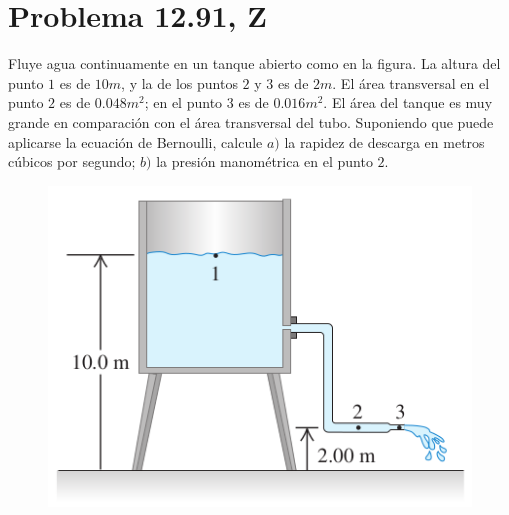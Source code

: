 \section*{Problema 12.91, Z}


Fluye agua continuamente en un tanque abierto como en la figura. La altura del punto $1$ es de $10m$, y la de los puntos $2$ y $3$ es de $2m$. El área transversal en el punto $2$ es de $0.048m^2$; en el punto $3$ es de $0.016m^2$. El área del tanque es muy grande en comparación con el área transversal del tubo. Suponiendo que puede aplicarse la ecuación de Bernoulli, calcule $a)$ la rapidez de descarga en metros cúbicos por segundo; $b)$ la presión manométrica en el punto $2$.


\begin{figure}[H]
	\centering
	\includegraphics[scale=0.5]{./img/1291.png}
\end{figure}

